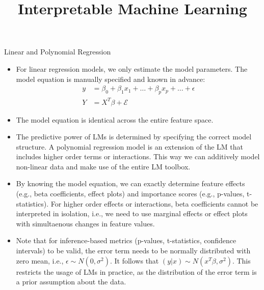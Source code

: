 \documentclass[11pt,compress,t,notes=noshow, xcolor=table]{beamer}
\title{Interpretable Machine Learning}
\institute{\href{https://compstat-lmu.github.io/lecture_iml/}{compstat-lmu.github.io/lecture\_iml}}
\date{}
\begin{document}


\newcommand{\titlefigure}{figure/open_blackbox}
\newcommand{\learninggoals}{
\item Examples for interpretable models: linear and polynomial regression models, generalized linear models, generalized additive models, model-based boosting, rule-based learning
\item Methodological summary, motivation behind the model, model interpretations}


\begin{vbframe}{Linear and Polynomial Regression}

\begin{itemize}
\setlength\itemsep{2em}
\item For linear regression models, we only estimate the model parameters. The model equation is manually specified and known in advance:
\begin{align*}
y &= \beta_0 + \beta_1 x_1 + \dots + \beta_p x_p + \dots + \epsilon \\
Y &= X^T\beta + \mathcal{E}
\end{align*}
\item The model equation is identical across the entire feature space.
\item The predictive power of LMs is determined by specifying the correct model structure. A polynomial regression model is an extension of the LM that includes higher order terms or interactions. This way we can additively model non-linear data and make use of the entire LM toolbox.
\item
By knowing the model equation, we can exactly determine feature effects (e.g., beta coefficients, effect plots) and importance scores (e.g., p-values, t-statistics). For higher order effects or interactions, beta coefficients cannot be interpreted in isolation, i.e., we need to use marginal effects or effect plots with simultaenous changes in feature values.
\item Note that for inference-based metrics (p-values, t-statistics, confidence intervals) to be valid, the error term needs to be normally distributed with zero mean, i.e., $\epsilon \sim N(0, \sigma^2)$. It follows that $(y \vert x) \sim N(x^T \beta, \sigma^2)$. This restricts the usage of LMs in practice, as the distribution of the error term is a prior assumption about the data.
\end{itemize}
\end{vbframe}
\end{document}
